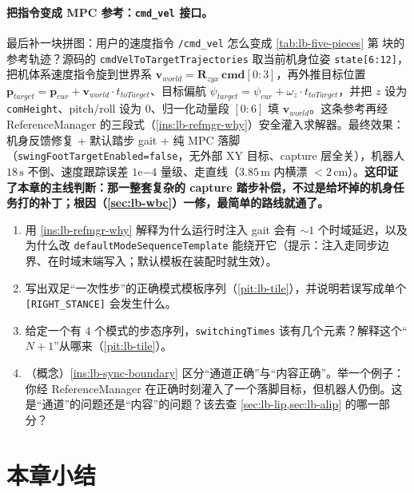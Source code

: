 \paragraph{把指令变成 MPC 参考：\texttt{cmd\_vel} 接口。}
最后补一块拼图：用户的速度指令 \texttt{/cmd\_vel} 怎么变成 \cref{tab:lb-five-pieces} 第  块的参考轨迹？源码的 \texttt{cmdVelToTargetTrajectories} 取当前机身位姿 \texttt{state[6:12]}，把机体系速度指令旋到世界系 $\mathbf{v}_{world}=\mathbf{R}_{zyx}\,\mathbf{cmd}[0:3]$，再外推目标位置 $\mathbf{p}_{target}=\mathbf{p}_{cur}+\mathbf{v}_{world}\cdot t_{toTarget}$、目标偏航 $\psi_{target}=\psi_{cur}+\omega_z\cdot t_{toTarget}$，并把 $z$ 设为 \texttt{comHeight}、pitch/roll 设为 $0$、归一化动量段 $[0:6]$ 填 $\mathbf{v}_{world}$。这条参考再经 ReferenceManager 的三段式（\cref{ins:lb-refmgr-why}）安全灌入求解器。最终效果：机身反馈修复 + 默认踏步 gait + 纯 MPC 落脚（\texttt{swingFootTargetEnabled=false}，无外部 XY 目标、capture 层全关），机器人 $18\,\mathrm{s}$ 不倒、速度跟踪误差 $1\mathrm{e}{-4}$ 量级、走直线（$3.85\,\mathrm{m}$ 内横漂 $<2\,\mathrm{cm}$）。\textbf{这印证了本章的主线判断：那一整套复杂的 capture 踏步补偿，不过是给坏掉的机身任务打的补丁；根因（\cref{sec:lb-wbc}）一修，最简单的路线就通了。}

\begin{practice}
\begin{enumerate}
  \item 用 \cref{ins:lb-refmgr-why} 解释为什么运行时注入 gait 会有 $\sim 1$ 个时域延迟，以及为什么改 \texttt{defaultModeSequenceTemplate} 能绕开它（提示：注入走同步边界、在时域末端写入；默认模板在装配时就生效）。
  \item 写出双足“一次性步”的正确模式模板序列（\cref{pit:lb-tile}），并说明若误写成单个 \texttt{[RIGHT\_STANCE]} 会发生什么。
  \item 给定一个有 $4$ 个模式的步态序列，\texttt{switchingTimes} 该有几个元素？解释这个“$N+1$”从哪来（\cref{pit:lb-tile}）。
  \item （概念）\cref{ins:lb-sync-boundary} 区分“通道正确”与“内容正确”。举一个例子：你经 ReferenceManager 在正确时刻灌入了一个落脚目标，但机器人仍倒。这是“通道”的问题还是“内容”的问题？该去查 \cref{sec:lb-lip,sec:lb-alip} 的哪一部分？
\end{enumerate}
\end{practice}

\section*{本章小结}

